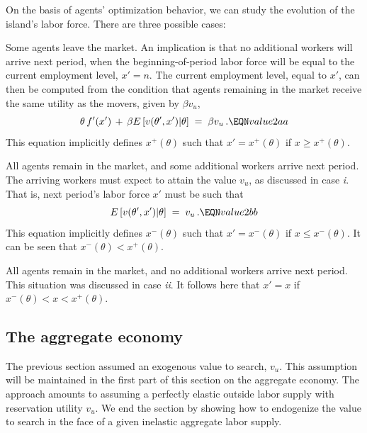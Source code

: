 On the basis of agents' optimization behavior, we can study the
evolution of the island's
labor force. There are three possible cases:

\medskip
{} Some agents leave the market. An implication is
that no
additional workers will arrive next period, when the beginning-of-period
labor force will be equal to the current employment level,
$x'=n$. The current employment level, equal to  $x'$, can then be computed from
the condition that agents remaining in the market receive the same
utility as the movers, given by $\beta v_u$,
$$\theta \, f'(x') \,+\, \beta E\left[v(\theta',x') \vert \theta \right]
      \;=\; \beta v_u \,.                                 \EQN value2aa
$$
This equation implicitly defines $x^+(\theta)$ such that
$x'=x^+(\theta)$ if $x\geq x^+(\theta)$.

\medskip
{} All agents remain in the market, and some additional
workers arrive next period. The arriving workers must expect to attain the
value $v_u$, as discussed in case {\it i}. That is, next period's
labor force $x'$ must be such that
$$ E\left[v(\theta',x') \vert \theta \right]
      \;=\; v_u \,.                                  \EQN value2bb
$$
This equation implicitly defines $x^-(\theta)$ such that
$x'=x^-(\theta)$ if $x\leq x^-(\theta)$. It can be seen that
$x^-(\theta) < x^+(\theta)$.

\medskip
{} All agents remain in the market, and no additional
workers arrive next period. This situation was discussed in case {\it ii}.
It follows here that $x'=x$ if $x^-(\theta) <x< x^+(\theta)$.



\subsection{The aggregate economy}

The previous section assumed an exogenous value to search,
$v_u$. This assumption will be maintained in the first part
of this section on the aggregate economy. The approach
amounts to assuming a perfectly elastic outside labor supply
with reservation utility $v_u$. We end the section by
showing how to endogenize the value to search in the face
of a given inelastic aggregate labor supply.

